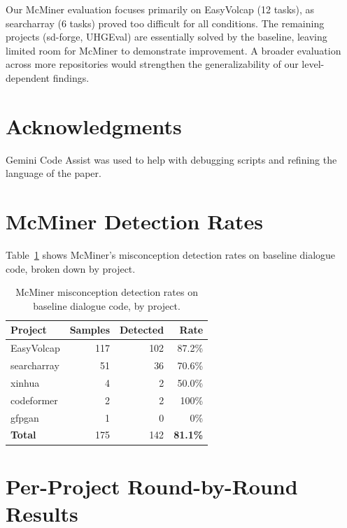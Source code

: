 \documentclass[11pt]{article}
\begin{document}
Our McMiner evaluation focuses primarily on EasyVolcap (12 tasks), as searcharray (6 tasks) proved too difficult for all conditions. The remaining projects (sd-forge, UHGEval) are essentially solved by the baseline, leaving limited room for McMiner to demonstrate improvement. A broader evaluation across more repositories would strengthen the generalizability of our level-dependent findings.

\section*{Acknowledgments}
Gemini Code Assist was used to help with debugging scripts and refining the language of the paper.



\appendix

\section{McMiner Detection Rates}
\label{sec:appendix-mcminer}

Table~\ref{tab:mcminer-detection} shows McMiner's misconception detection rates on baseline dialogue code, broken down by project.

\begin{table}[h]
  \centering
  \small
  \begin{tabular}{lrrr}
    \toprule
    \textbf{Project} & \textbf{Samples} & \textbf{Detected} & \textbf{Rate} \\
    \midrule
    EasyVolcap     & 117 & 102 & 87.2\% \\
    searcharray    & 51  & 36  & 70.6\% \\
    xinhua         & 4   & 2   & 50.0\% \\
    codeformer     & 2   & 2   & 100\%  \\
    gfpgan         & 1   & 0   & 0\%    \\
    \midrule
    \textbf{Total} & 175 & 142 & \textbf{81.1\%} \\
    \bottomrule
  \end{tabular}
  \caption{McMiner misconception detection rates on baseline dialogue code, by project.}
  \label{tab:mcminer-detection}
\end{table}

\section{Per-Project Round-by-Round Results}
\label{sec:appendix-rounds}
\end{document}
